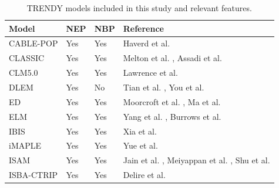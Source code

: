 \documentclass[9pt,twoside,lineno]{pnas-new_SI}
\begin{document}
\begin{table}[ht]
\centering
\label{Tab:TRENDYmodels}
\caption{TRENDY models included in this study and relevant features.}
\begin{tabular}{llll}
\textbf{Model} & \textbf{NEP} & \textbf{NBP} & \textbf{Reference}                                                                                                                  \\ \hline
CABLE-POP      & Yes          & Yes          & Haverd et al. \cite{Haverd2018}                                                                                                                \\
CLASSIC        & Yes          & Yes          & Melton et al. \cite{Melton2020}, Assadi et al. \cite{Asaadi2018}                                                                                                               \\
CLM5.0         & Yes          & Yes          & Lawrence et al. \cite{Lawrence2019}                                                                                                              \\
DLEM           & Yes          & No           & Tian et al. \cite{Tian2015}, You et al. \cite{You2022}                                                                                               \\
ED             & Yes          & Yes          & Moorcroft et al. \cite{Moorcroft2001}, Ma et al. \cite{Ma2022}                                                                                           \\
ELM            & Yes          & Yes          & Yang et al. \cite{Yang2023}, Burrows et al. \cite{Burrows2020}                                                                                            \\
IBIS           & Yes          & Yes          & Xia et al. \cite{Xia2024}                                                                                                                   \\
iMAPLE         & Yes          & Yes          & Yue et al. \cite{Yue2024}                                                                                                                   \\
ISAM           & Yes          & Yes          & Jain et al. \cite{Jain2013}, Meiyappan et al. \cite{Meiyappan2015}, Shu et al. \cite{Shu2020}                            \\
ISBA-CTRIP& Yes          & Yes          & Delire et al. \cite{Delire2020}                                                                                                               \\

\end{tabular}
\end{table}
\end{document}
